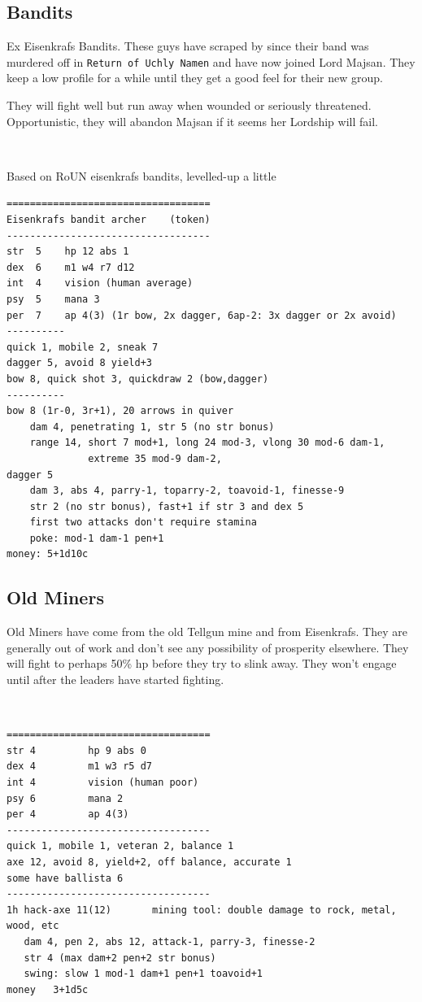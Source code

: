 

\begin{samepage}
\subsection*{Bandits}
Ex Eisenkrafs Bandits. These guys have scraped by since their band was murdered off in \texttt{Return of Uchly Namen} and have now joined Lord Majsan. They keep a low profile for a while until they get a good feel for their new group.

They will fight well but run away when wounded or seriously threatened. Opportunistic, they will abandon Majsan if it seems her Lordship will fail.

\

\noindent
Based on RoUN eisenkrafs bandits, levelled-up a little
\small \begin{verbatim}
===================================
Eisenkrafs bandit archer    (token)
-----------------------------------
str  5    hp 12 abs 1
dex  6    m1 w4 r7 d12
int  4    vision (human average)
psy  5    mana 3
per  7    ap 4(3) (1r bow, 2x dagger, 6ap-2: 3x dagger or 2x avoid)
----------
quick 1, mobile 2, sneak 7
dagger 5, avoid 8 yield+3
bow 8, quick shot 3, quickdraw 2 (bow,dagger)
----------
bow 8 (1r-0, 3r+1), 20 arrows in quiver
    dam 4, penetrating 1, str 5 (no str bonus)
    range 14, short 7 mod+1, long 24 mod-3, vlong 30 mod-6 dam-1,
              extreme 35 mod-9 dam-2,
dagger 5
    dam 3, abs 4, parry-1, toparry-2, toavoid-1, finesse-9
    str 2 (no str bonus), fast+1 if str 3 and dex 5
    first two attacks don't require stamina
    poke: mod-1 dam-1 pen+1
money: 5+1d10c
\end{verbatim} \normalsize
\end{samepage}



\begin{samepage}
\subsection*{Old Miners}
Old Miners have come from the old Tellgun mine and from Eisenkrafs. They are generally out of work and don't see any possibility of prosperity elsewhere. They will fight to perhaps 50\% hp before they try to slink away. They won't engage until after the leaders have started fighting.

\

\small \begin{verbatim}
===================================
str 4         hp 9 abs 0
dex 4         m1 w3 r5 d7
int 4         vision (human poor)
psy 6         mana 2
per 4         ap 4(3)
-----------------------------------
quick 1, mobile 1, veteran 2, balance 1
axe 12, avoid 8, yield+2, off balance, accurate 1
some have ballista 6
-----------------------------------
1h hack-axe 11(12)       mining tool: double damage to rock, metal, wood, etc
   dam 4, pen 2, abs 12, attack-1, parry-3, finesse-2
   str 4 (max dam+2 pen+2 str bonus)
   swing: slow 1 mod-1 dam+1 pen+1 toavoid+1
money	3+1d5c
\end{verbatim} \normalsize
\end{samepage}

